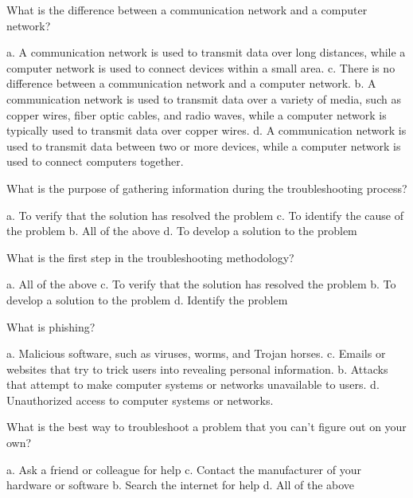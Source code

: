 \documentclass{exam}
\begin{document}
\begin{questions}
\question What is the difference between a communication network and a computer network?
\begin{checkboxes}
\choice a. A communication network is used to transmit data over long distances, while a computer network is used to connect devices within a small area.
\choice c. There is no difference between a communication network and a computer network.
\choice b. A communication network is used to transmit data over a variety of media, such as copper wires, fiber optic cables, and radio waves, while a computer network is typically used to transmit data over copper wires.
\CorrectChoice d. A communication network is used to transmit data between two or more devices, while a computer network is used to connect computers together.
\end{checkboxes}

\question What is the purpose of gathering information during the troubleshooting process?
\begin{checkboxes}
\choice a. To verify that the solution has resolved the problem
\choice c. To identify the cause of the problem
\CorrectChoice b. All of the above
\choice d. To develop a solution to the problem
\end{checkboxes}

\question What is the first step in the troubleshooting methodology?
\begin{checkboxes}
\choice a. All of the above
\choice c. To verify that the solution has resolved the problem
\choice b. To develop a solution to the problem
\CorrectChoice d. Identify the problem
\end{checkboxes}

\question What is phishing?
\begin{checkboxes}
\choice a. Malicious software, such as viruses, worms, and Trojan horses.
\CorrectChoice c. Emails or websites that try to trick users into revealing personal information.
\choice b. Attacks that attempt to make computer systems or networks unavailable to users.
\choice d. Unauthorized access to computer systems or networks.
\end{checkboxes}

\question What is the best way to troubleshoot a problem that you can't figure out on your own?
\begin{checkboxes}
\choice a. Ask a friend or colleague for help
\choice c. Contact the manufacturer of your hardware or software
\choice b. Search the internet for help
\CorrectChoice d. All of the above
\end{checkboxes}


\end{questions}
\end{document}
